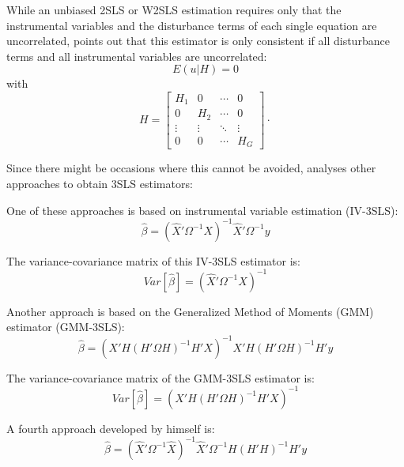 \documentclass[article]{jss}
\begin{document}
While an unbiased 2SLS or W2SLS estimation requires only that 
the instrumental variables and the disturbance terms of each single 
equation are uncorrelated,
\cite{schmidt90} points out that this estimator is only consistent 
if all disturbance terms and all instrumental variables are uncorrelated:
\begin{equation}
   E \left( u | H \right) = 0
\end{equation}
with
\begin{equation}
   H =
   \left[ \begin{array}{cccc}
      H_1 & 0 & \cdots & 0\\
      0 & H_2 & \cdots & 0\\
      \vdots & \vdots & \ddots & \vdots\\
      0 & 0 & \cdots & H_G
   \end{array}\right] \cdot 
\end{equation}

Since there might be occasions where this cannot be avoided, 
\cite{schmidt90} analyses other approaches to obtain 3SLS estimators:

One of these approaches is based on instrumental variable estimation
(IV-3SLS):
\begin{equation}
   \widehat{\beta} = \left( \widehat{X}' \Omega^{-1} X 
   \right)^{-1} \widehat{X}' \Omega^{-1} y
\end{equation}

The variance-covariance matrix of this IV-3SLS estimator is:
\begin{equation}
   Var \left[ \widehat{\beta} \right] = \left( \widehat{X}' \Omega^{-1} 
   X \right)^{-1}
\end{equation}


Another approach is based on the Generalized Method of Moments (GMM) 
estimator (GMM-3SLS):
\begin{equation}
   \widehat{\beta} = \left( X' H \left( H' \Omega H \right)^{-1}
   H' X \right)^{-1} X' H \left( H' \Omega H \right)^{-1} H' y
   \label{eq:beta3slsGMM}
\end{equation}

The variance-covariance matrix of the GMM-3SLS estimator is:
\begin{equation}
   Var \left[ \widehat{\beta} \right] = 
   \left( X' H \left( H' \Omega H \right)^{-1} H' X \right)^{-1}
\end{equation}


A fourth approach developed by \cite{schmidt90} himself is:
\begin{equation}
   \widehat{\beta} = \left( \widehat{X}' \Omega^{-1} \widehat{X} 
   \right)^{-1} \widehat{X}' \Omega^{-1} 
   H \left( H' H \right)^{-1} H' y 
   \label{eq:beta3slsSchmidt}
\end{equation}
\end{document}
